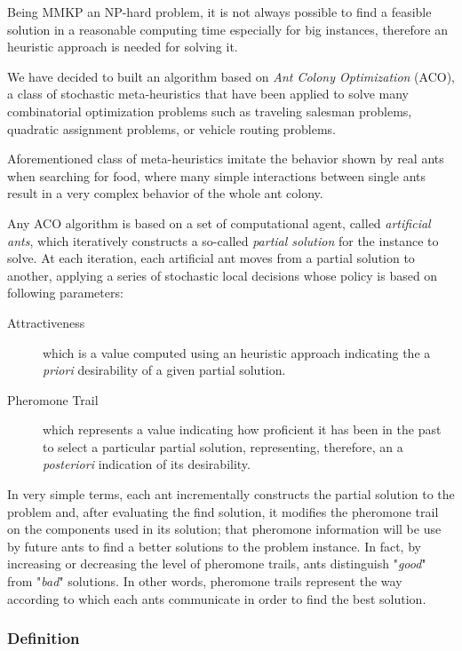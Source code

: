 \documentclass[12pt,a4paper]{report}
\begin{document}
Being MMKP an NP-hard problem, it is not always possible to find a feasible solution in a reasonable computing time especially for big instances, therefore an heuristic approach is needed for solving it. 

We have decided to built an algorithm based on \textit{Ant Colony Optimization} (ACO), a class of stochastic meta-heuristics that have been applied to solve many combinatorial optimization problems such as traveling salesman problems, quadratic assignment problems, or vehicle routing problems. 

Aforementioned class of meta-heuristics imitate the behavior shown by real ants when searching for food, where many simple interactions between single ants result in a very complex behavior of the whole ant colony.

Any ACO algorithm is based on a set of computational agent, called \textit{artificial ants}, which iteratively constructs a so-called  \textit{partial solution} for the instance to solve. At each iteration, each artificial ant moves from a partial solution to another, applying a series of stochastic local decisions whose policy is based on following parameters:

\begin{description}
	\item[Attractiveness] which is a value computed using an heuristic approach indicating the a \textit{priori} desirability of a given partial solution.
	
	\item[Pheromone Trail] which represents a value indicating how proficient it has been in the past to select a particular partial solution, representing, therefore, an a \textit{posteriori} indication of its desirability.
\end{description} 

In very simple terms, each ant incrementally constructs the partial solution to the problem and, after evaluating the find solution, it modifies the pheromone trail on the components used in its solution; that pheromone information will be use by future ants to find a better solutions to the problem instance. In fact, by increasing or decreasing the level of pheromone trails, ants distinguish "\textit{good}" from "\textit{bad}" solutions. In other words, pheromone trails represent the way according to which each ants communicate in order to find the best solution.
 
\subsubsection{Definition}
\end{document}
